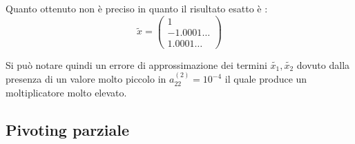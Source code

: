 \documentclass[12pt, a4paper]{book}
\theoremstyle{definition}
\begin{document}
\begin{flushleft}
Quanto ottenuto non è preciso in quanto il risultato esatto è : 
\[ 	
	\tilde{x} = 
	\begin{pmatrix}
		 1 \\
		 -1.0001 \dots \\
		 1.0001 \dots
	\end{pmatrix}
\]

Si può notare quindi un  errore di approssimazione dei termini $\tilde{x_{1}}, \tilde{x_{2}}$ dovuto dalla presenza di un valore molto piccolo in $a^{(2)}_{22} = 10^{-4}$ il quale produce un moltiplicatore molto elevato.
\end{flushleft}

\subsection{Pivoting parziale}
\end{document}
